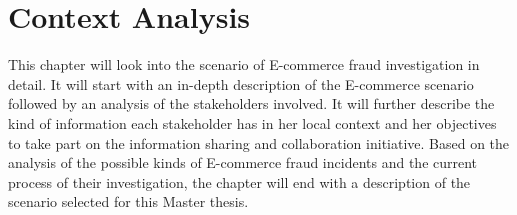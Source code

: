 
\chapter{Context Analysis} %
\label{cha:context_analysis}

This chapter will look into the scenario of E-commerce fraud investigation in detail. It will start with an in-depth description of the E-commerce scenario followed by an analysis of the stakeholders involved. It will further describe the kind of information each stakeholder has in her local context and her objectives to take part on the information sharing and collaboration initiative. Based on the analysis of the possible kinds of E-commerce fraud incidents and the current process of their investigation, the chapter will end with a description of the scenario selected for this Master thesis.











